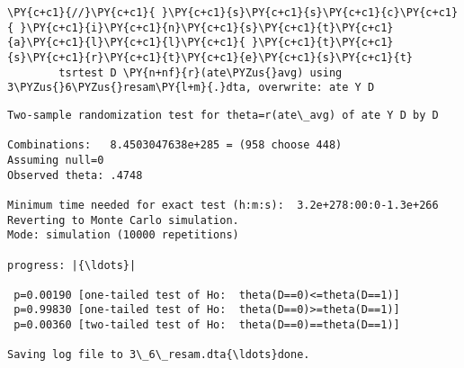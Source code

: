 \documentclass[11pt,notitlepage]{article}\usepackage[]{graphicx}\usepackage[]{color}
\makeatletter
\newenvironment{kframe}{%
 \def\at@end@of@kframe{}%
 \ifinner\ifhmode%
  \def\at@end@of@kframe{\end{minipage}}%
  \begin{minipage}{\columnwidth}%
 \fi\fi%
 \def\FrameCommand##1{\hskip\@totalleftmargin \hskip-\fboxsep
 \colorbox{shadecolor}{##1}\hskip-\fboxsep
     \hskip-\linewidth \hskip-\@totalleftmargin \hskip\columnwidth}%
 \MakeFramed {\advance\hsize-\width
   \@totalleftmargin\z@ \linewidth\hsize
   \@setminipage}}%
 {\par\unskip\endMakeFramed%
 \at@end@of@kframe}
\newenvironment{knitrout}{}{} %
\makeatother
\begin{document}
\begin{knitrout}
\begin{kframe}
\begin{Verbatim}[commandchars=\\\{\}]
        \PY{c+c1}{//}\PY{c+c1}{ }\PY{c+c1}{s}\PY{c+c1}{s}\PY{c+c1}{c}\PY{c+c1}{ }\PY{c+c1}{i}\PY{c+c1}{n}\PY{c+c1}{s}\PY{c+c1}{t}\PY{c+c1}{a}\PY{c+c1}{l}\PY{c+c1}{l}\PY{c+c1}{ }\PY{c+c1}{t}\PY{c+c1}{s}\PY{c+c1}{r}\PY{c+c1}{t}\PY{c+c1}{e}\PY{c+c1}{s}\PY{c+c1}{t}
        tsrtest D \PY{n+nf}{r}(ate\PYZus{}avg) using 3\PYZus{}6\PYZus{}resam\PY{l+m}{.}dta, overwrite: ate Y D
\end{Verbatim}

    \begin{Verbatim}[commandchars=\\\{\}]
Two-sample randomization test for theta=r(ate\_avg) of ate Y D by D

Combinations:   8.4503047638e+285 = (958 choose 448)
Assuming null=0
Observed theta: .4748

Minimum time needed for exact test (h:m:s):  3.2e+278:00:0-1.3e+266
Reverting to Monte Carlo simulation.
Mode: simulation (10000 repetitions)

progress: |{\ldots}|

 p=0.00190 [one-tailed test of Ho:  theta(D==0)<=theta(D==1)]
 p=0.99830 [one-tailed test of Ho:  theta(D==0)>=theta(D==1)]
 p=0.00360 [two-tailed test of Ho:  theta(D==0)==theta(D==1)]

Saving log file to 3\_6\_resam.dta{\ldots}done.

    \end{Verbatim}


\end{kframe}
\end{knitrout}
\end{document}
